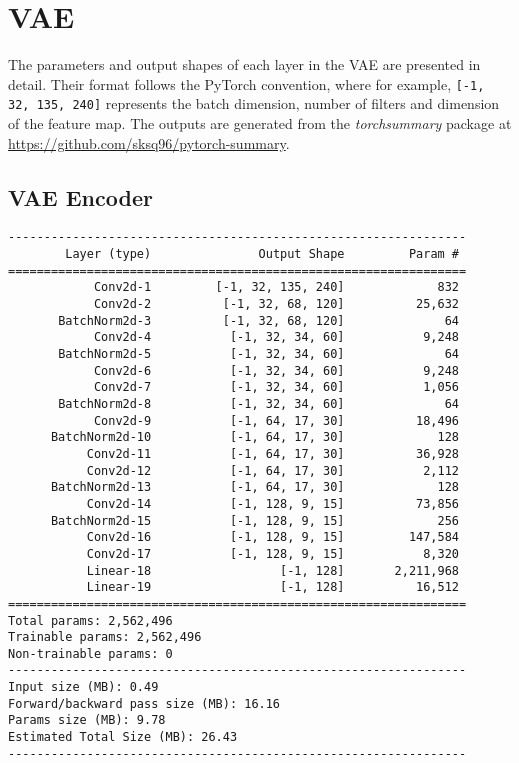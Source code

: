 \chapter{VAE}
\label{app:vae_params}
The parameters and output shapes of each layer in the VAE are presented in detail. Their format follows the PyTorch convention, where for example, \verb+[-1, 32, 135, 240]+ represents the batch dimension, number of filters and dimension of the feature map. The outputs are generated from the \textit{torchsummary} package at \url{https://github.com/sksq96/pytorch-summary}.

\section{VAE Encoder}
\label{app:vae_encoder}
\begin{verbatim}
----------------------------------------------------------------
        Layer (type)               Output Shape         Param #
================================================================
            Conv2d-1         [-1, 32, 135, 240]             832
            Conv2d-2          [-1, 32, 68, 120]          25,632
       BatchNorm2d-3          [-1, 32, 68, 120]              64
            Conv2d-4           [-1, 32, 34, 60]           9,248
       BatchNorm2d-5           [-1, 32, 34, 60]              64
            Conv2d-6           [-1, 32, 34, 60]           9,248
            Conv2d-7           [-1, 32, 34, 60]           1,056
       BatchNorm2d-8           [-1, 32, 34, 60]              64
            Conv2d-9           [-1, 64, 17, 30]          18,496
      BatchNorm2d-10           [-1, 64, 17, 30]             128
           Conv2d-11           [-1, 64, 17, 30]          36,928
           Conv2d-12           [-1, 64, 17, 30]           2,112
      BatchNorm2d-13           [-1, 64, 17, 30]             128
           Conv2d-14           [-1, 128, 9, 15]          73,856
      BatchNorm2d-15           [-1, 128, 9, 15]             256
           Conv2d-16           [-1, 128, 9, 15]         147,584
           Conv2d-17           [-1, 128, 9, 15]           8,320
           Linear-18                  [-1, 128]       2,211,968
           Linear-19                  [-1, 128]          16,512
================================================================
Total params: 2,562,496
Trainable params: 2,562,496
Non-trainable params: 0
----------------------------------------------------------------
Input size (MB): 0.49
Forward/backward pass size (MB): 16.16
Params size (MB): 9.78
Estimated Total Size (MB): 26.43
----------------------------------------------------------------
\end{verbatim}

